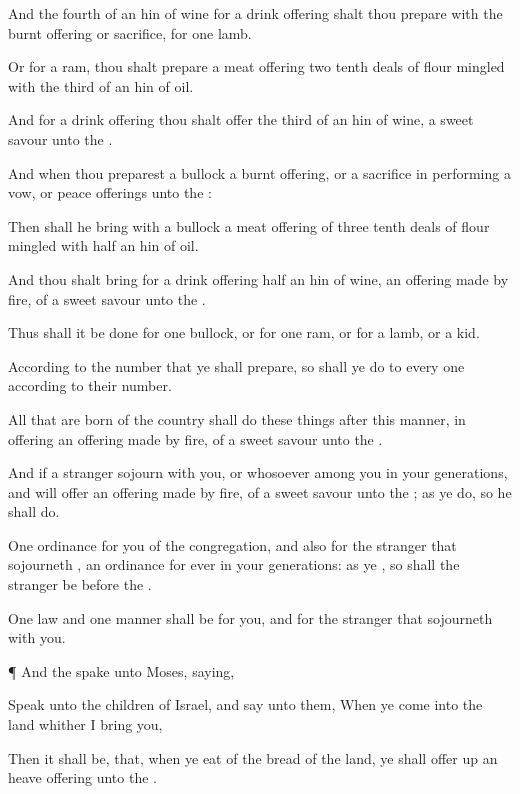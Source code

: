{And the
fourth
{} of an
hin of
wine for a drink
offering shalt thou
prepare with the burnt
offering or
sacrifice, for
one
lamb.

Or for a
ram, thou shalt
prepare
{} a meat
offering
two tenth
deals of
flour
mingled with the
third
{} of an
hin of
oil.

And for a drink
offering thou shalt
offer the
third
{} of an
hin of
wine,
{} a
sweet
savour unto the
{}.

And when thou
preparest a
bullock
{} a burnt
offering, or
{} a
sacrifice in
performing a
vow, or peace
offerings unto the
{}:

Then shall he
bring with a
bullock a meat
offering of
three tenth
deals of
flour
mingled with
half an
hin of
oil.

And thou shalt
bring for a drink
offering
half an
hin of
wine,
{} an offering made by
fire, of a
sweet
savour unto the
{}.

Thus shall it be
done for
one
bullock, or for
one
ram, or for a
lamb, or a
kid.

According to the
number that ye shall
prepare,
so shall ye
do to every
one according to their
number.

All that are born of the
country shall
do these things after this manner, in
offering an offering made by
fire, of a
sweet
savour unto the
{}.

And if a
stranger
sojourn with you, or whosoever
{}
among you in your
generations, and will
offer an offering made by
fire, of a
sweet
savour unto the
{}; as ye
do, so he shall
do.

One
ordinance
{} for you of the
congregation, and also for the
stranger that
sojourneth
{}, an
ordinance for
ever in your
generations: as ye
{}, so shall the
stranger be
before the
{}.

One
law and
one
manner shall be for you, and for the
stranger that
sojourneth with you.


\par }{\PP {}¶ And the
{}
spake unto
Moses,
saying,

Speak unto the
children of
Israel, and
say unto them, When ye
come into the
land whither I
bring you,

Then it shall be, that, when ye
eat of the
bread of the
land, ye shall offer
up an heave
offering unto the
{}.

}

